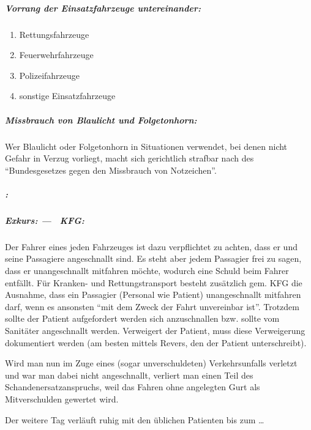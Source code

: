 \subparagraph{Vorrang der Einsatzfahrzeuge untereinander:}

\begin{enumerate}
    \item Rettungsfahrzeuge
    \item Feuerwehrfahrzeuge
    \item Polizeifahrzeuge
    \item sonstige Einsatzfahrzeuge
\end{enumerate}

\subparagraph{Missbrauch von Blaulicht und Folgetonhorn:}


Wer Blaulicht oder Folgetonhorn in Situationen verwendet, bei denen
nicht Gefahr in Verzug vorliegt, macht sich gerichtlich strafbar nach
 des "`Bundesgesetzes gegen
den Missbrauch von Notzeichen"'.

\subparagraph{:}

\subparagraph{Exkurs:  --- ~KFG:}

Der Fahrer eines jeden Fahrzeuges ist dazu verpflichtet zu achten, dass
er und seine Passagiere angeschnallt sind. Es steht aber jedem
Passagier frei zu sagen, dass er unangeschnallt mitfahren möchte,
wodurch eine Schuld beim Fahrer entfällt. Für Kranken- und
Rettungstransport besteht zusätzlich gem.  KFG die
Ausnahme, dass ein Passagier (Personal wie Patient) unangeschnallt mitfahren darf, wenn es ansonsten
"`mit dem Zweck der Fahrt unvereinbar
ist"'. Trotzdem sollte der Patient aufgefordert werden
sich anzuschnallen bzw. sollte vom Sanitäter angeschnallt werden.
Verweigert der Patient, muss diese Verweigerung dokumentiert werden (am
besten mittels Revers, den der Patient unterschreibt).

Wird man nun im Zuge eines (sogar unverschuldeten) Verkehrsunfalls
verletzt und war man dabei nicht angeschnallt, verliert man einen Teil
des Schandenersatzanspruchs, weil das Fahren ohne angelegten Gurt als
Mitverschulden gewertet wird.




\vspace{1em}
Der weitere Tag verläuft ruhig mit den üblichen Patienten
bis zum \ldots

\vspace{1em}
{\centering
{}
\par}


